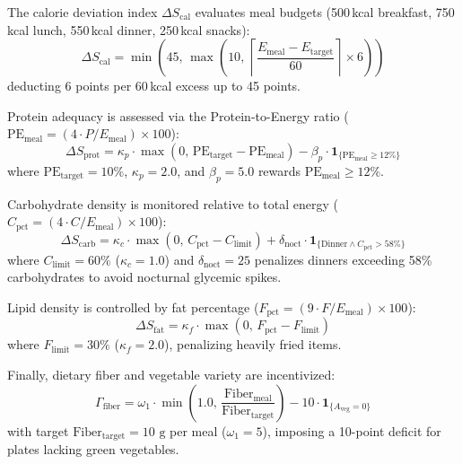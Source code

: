 \documentclass[conference]{IEEEtran}
\begin{document}
The calorie deviation index $\Delta S_{\text{cal}}$ evaluates meal budgets (500\,kcal breakfast, 750\,kcal lunch, 550\,kcal dinner, 250\,kcal snacks):
\begin{equation}
\Delta S_{\text{cal}} = \min \left( 45, \, \max \left( 10, \, \left\lceil \frac{E_{\text{meal}} - E_{\text{target}}}{60} \right\rceil \times 6 \right) \right)
\label{eq:pen_cal}
\end{equation}
deducting 6 points per 60\,kcal excess up to 45 points.

Protein adequacy is assessed via the Protein-to-Energy ratio ($\text{PE}_{\text{meal}} = (4 \cdot P / E_{\text{meal}}) \times 100$):
\begin{equation}
\Delta S_{\text{prot}} = \kappa_p \cdot \max (0, \, \text{PE}_{\text{target}} - \text{PE}_{\text{meal}}) - \beta_p \cdot \mathbf{1}_{\{\text{PE}_{\text{meal}} \ge 12\%\}}
\label{eq:pen_prot}
\end{equation}
where $\text{PE}_{\text{target}} = 10\%$, $\kappa_p = 2.0$, and $\beta_p = 5.0$ rewards $\text{PE}_{\text{meal}} \ge 12\%$.

Carbohydrate density is monitored relative to total energy ($C_{\text{pct}} = (4 \cdot C / E_{\text{meal}}) \times 100$):
\begin{equation}
\Delta S_{\text{carb}} = \kappa_c \cdot \max (0, \, C_{\text{pct}} - C_{\text{limit}}) + \delta_{\text{noct}} \cdot \mathbf{1}_{\{\text{Dinner} \wedge C_{\text{pct}} > 58\%\}}
\label{eq:pen_carb}
\end{equation}
where $C_{\text{limit}} = 60\%$ ($\kappa_c = 1.0$) and $\delta_{\text{noct}} = 25$ penalizes dinners exceeding 58\% carbohydrates to avoid nocturnal glycemic spikes.

Lipid density is controlled by fat percentage ($F_{\text{pct}} = (9 \cdot F / E_{\text{meal}}) \times 100$):
\begin{equation}
\Delta S_{\text{fat}} = \kappa_f \cdot \max (0, \, F_{\text{pct}} - F_{\text{limit}})
\label{eq:pen_fat}
\end{equation}
where $F_{\text{limit}} = 30\%$ ($\kappa_f = 2.0$), penalizing heavily fried items.

Finally, dietary fiber and vegetable variety are incentivized:
\begin{equation}
\Gamma_{\text{fiber}} = \omega_1 \cdot \min \left( 1.0, \, \frac{\text{Fiber}_{\text{meal}}}{\text{Fiber}_{\text{target}}} \right) - 10 \cdot \mathbf{1}_{\{A_{\text{veg}} = 0\}}
\label{eq:bonus_fiber}
\end{equation}
with target $\text{Fiber}_{\text{target}} = 10\text{ g}$ per meal ($\omega_1 = 5$), imposing a 10-point deficit for plates lacking green vegetables.
\end{document}
